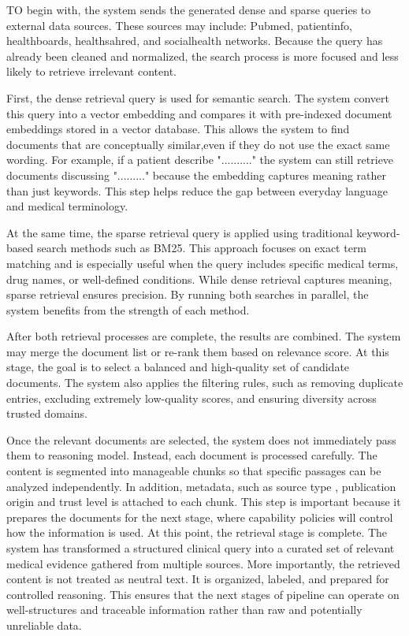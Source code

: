 \documentclass[conference, anonymous]{IEEEtran}
\begin{document}
TO begin with, the system sends the generated dense and sparse queries to external data sources. These sources may include: Pubmed, patientinfo, healthboards, healthsahred, and socialhealth networks. Because the query has already been cleaned and normalized, the search process is more focused and less likely to retrieve irrelevant content.

First, the dense retrieval query is used for semantic search. The system convert this query into a vector embedding and compares it with pre-indexed document embeddings stored in a vector database. This allows the system to find documents that are conceptually similar,even if they do not use the exact same wording. For example, if a patient describe ".........." the system can still retrieve documents discussing "........." because the embedding captures meaning rather than just keywords. This step helps reduce the gap between everyday language and medical terminology.

At the same time, the sparse retrieval query is applied using traditional keyword-based search methods such as BM25. This approach focuses on exact term matching and is especially useful when the query includes specific medical terms, drug names, or well-defined conditions. While dense retrieval captures meaning, sparse retrieval ensures precision. By running both searches in parallel, the system benefits from the strength of each method.

After both retrieval processes are complete, the results are combined. The system may merge the document list or re-rank them based on relevance score. At this stage, the goal is to select a balanced and high-quality set of candidate documents. The system also applies the filtering rules, such as removing duplicate entries, excluding extremely low-quality scores, and ensuring diversity across trusted domains.

Once the relevant documents are selected, the system does not immediately pass them to reasoning model. Instead, each document is processed carefully. The content is segmented into manageable chunks so that specific passages can be analyzed independently. In addition, metadata, such as source type , publication origin and trust level is attached to each chunk. This step is important because it prepares the documents for the next stage, where capability policies will control how the information is used.
At this point, the retrieval stage is complete. The system has transformed a structured clinical query into a curated set of relevant medical evidence gathered from multiple sources. More importantly, the retrieved content is not treated as neutral text.  It is organized, labeled, and prepared for controlled reasoning. This ensures that the next stages of pipeline can operate on well-structures and traceable information rather than raw and potentially unreliable data.
\end{document}
